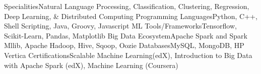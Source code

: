 \begin{cvskills}
\cvskill
{Specialities}{Natural Language Processing, Classification, Clustering, Regression, Deep Learning, \& Distributed Computing}
\cvskill
{Programming Languages}{Python, C++, Shell Scripting, Java, Groovy, Javascript}
\cvskill
{ML Tools/Frameworks}{Tensorflow, Scikit-Learn, Pandas, Matplotlib}
\cvskill
{Big Data Ecosystem}{Apache Spark and Spark Mllib, Apache Hadoop, Hive, Sqoop, Oozie}
\cvskill
{Databases}{MySQL, MongoDB, HP Vertica}
\cvskill
{Certifications}{Scalable Machine Learning(edX), Introduction to Big Data with Apache Spark (edX), Machine Learning (Coursera)}
\end{cvskills}
